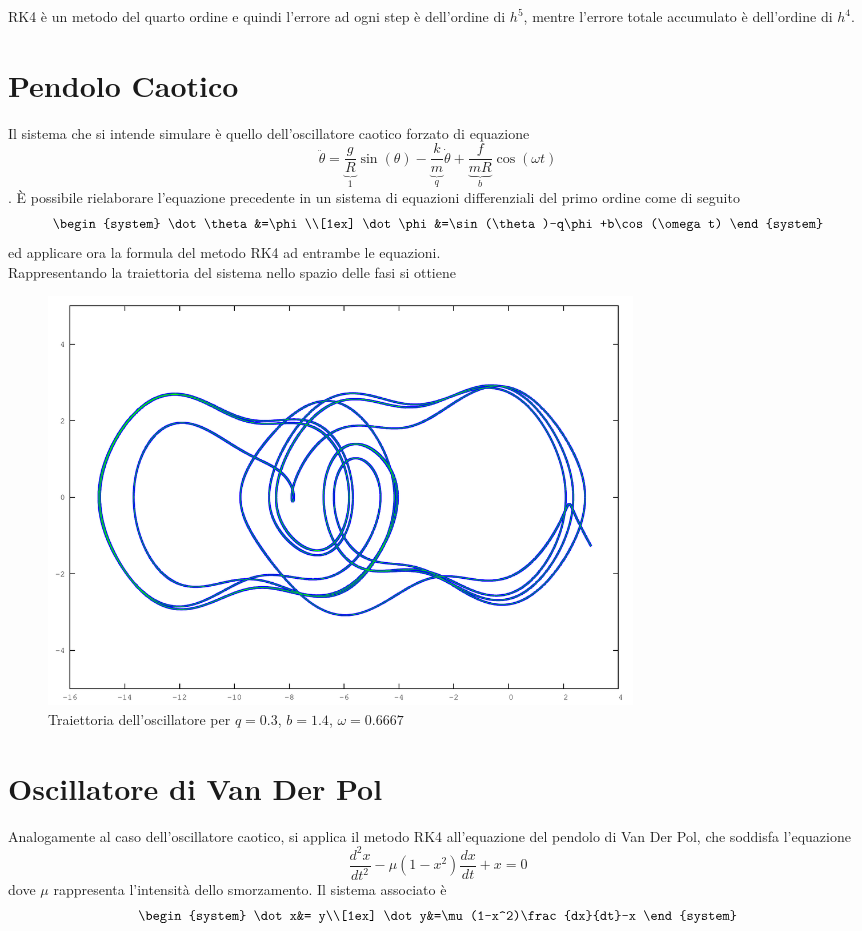 RK4 è un metodo del quarto ordine e quindi l'errore ad ogni step è dell'ordine di $h^5$, mentre l'errore totale accumulato è dell'ordine di $h^4$.

\section{Pendolo Caotico}
Il sistema che si intende simulare è quello dell'oscillatore caotico forzato di equazione
$$\ddot{\theta} = \underbrace{\frac{g}{R}}_1 \sin(\theta)-\underbrace{\frac{k}{m}}_q \dot{\theta}+\underbrace{\frac{f}{mR}}_b \cos(\omega t)$$.
È possibile rielaborare l'equazione precedente in un sistema di equazioni differenziali del primo ordine come di seguito
$$\begin{system}
\dot\theta&=\phi \\[1ex] \dot\phi&=\sin(\theta)-q\phi+b\cos(\omega t)
\end{system}$$
ed applicare ora la formula del metodo RK4 ad entrambe le equazioni.
\\

Rappresentando la traiettoria del sistema nello spazio delle fasi si ottiene
\begin{figure}[H]
\centering
\includegraphics[width=0.75\textwidth]{chaotic}
\caption{Traiettoria dell'oscillatore per $q = 0.3$, $b = 1.4$, $\omega = 0.6667$}
\label{fig:chaotic}
\end{figure}

\section{Oscillatore di Van Der Pol}
Analogamente al caso dell'oscillatore caotico, si applica il metodo RK4 all'equazione del pendolo di Van Der Pol, che soddisfa l'equazione
$$\frac{d^2x}{dt^2}-\mu(1-x^2)\frac{dx}{dt}+x= 0$$
dove $\mu$ rappresenta l'intensità dello smorzamento. Il sistema associato è
$$\begin{system}
\dot x&= y\\[1ex] \dot y&=\mu(1-x^2)\frac{dx}{dt}-x
\end{system}$$

